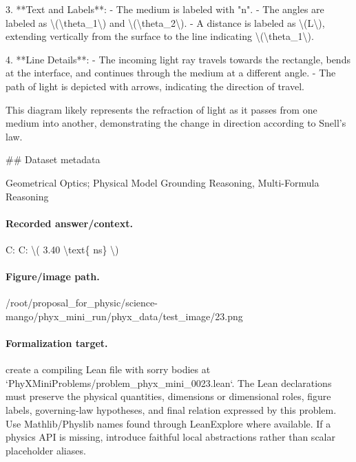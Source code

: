 3. **Text and Labels**:
   - The medium is labeled with "n".
   - The angles are labeled as \textbackslash{}(\textbackslash{}theta\_1\textbackslash{}) and \textbackslash{}(\textbackslash{}theta\_2\textbackslash{}).
   - A distance is labeled as \textbackslash{}(L\textbackslash{}), extending vertically from the surface to the line indicating \textbackslash{}(\textbackslash{}theta\_1\textbackslash{}).

4. **Line Details**:
   - The incoming light ray travels towards the rectangle, bends at the interface, and continues through the medium at a different angle.
   - The path of light is depicted with arrows, indicating the direction of travel.

This diagram likely represents the refraction of light as it passes from one medium into another, demonstrating the change in direction according to Snell's law.

\#\# Dataset metadata

Geometrical Optics; Physical Model Grounding Reasoning, Multi-Formula Reasoning

\paragraph{Recorded answer/context.}
C: C: \textbackslash{}( 3.40 \textbackslash{}text\{ ns\} \textbackslash{})

\paragraph{Figure/image path.}
/root/proposal\_for\_physic/science-mango/phyx\_mini\_run/phyx\_data/test\_image/23.png

\paragraph{Formalization target.}
create a compiling Lean file with sorry bodies at `PhyXMiniProblems/problem\_phyx\_mini\_0023.lean`. The Lean declarations must preserve the physical quantities, dimensions or dimensional roles, figure labels, governing-law hypotheses, and final relation expressed by this problem.
Use Mathlib/Physlib names found through LeanExplore where available. If a physics API is missing, introduce faithful local abstractions rather than scalar placeholder aliases.

